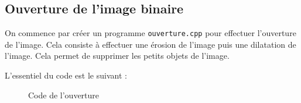 \documentclass[french,a4paper,10pt]{article}
\begin{document}
	\newpage
	\subsection{Ouverture de l'image binaire}\label{subsec:3.2}

	On commence par créer un programme \texttt{ouverture.cpp} pour effectuer l'ouverture de l'image.
	Cela consiste à effectuer une érosion de l'image puis une dilatation de l'image.
	Cela permet de supprimer les petits objets de l'image.

	L'essentiel du code est le suivant : %
	\begin{figure}[!htb]
		\centering
		\caption{Code de l'ouverture}\label{Fig:ouverture-code}
	\end{figure}
\end{document}
